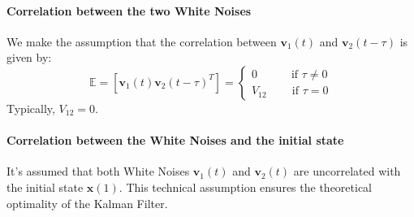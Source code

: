 \paragraph*{Correlation between the two White Noises}
We make the assumption that the correlation between $\mathbf{v}_1(t)$ and $\mathbf{v}_2(t-\tau)$ is given by:
\[\mathbb{E}=\left[\mathbf{v}_1(t)\mathbf{v}_2(t-\tau)^T\right]=\begin{cases}
    0 \qquad\quad\text{if }\tau\neq 0 \\
    V_{12} \qquad\:\text{if }\tau= 0
\end{cases}\]
Typically, $V_{12}=0$.

\paragraph*{Correlation between the White Noises and the initial state}
It's assumed that both White Noises $\mathbf{v}_1(t)$ and $\mathbf{v}_2(t)$ are uncorrelated with the initial state $\mathbf{x}(1)$. 
This technical assumption ensures the theoretical optimality of the Kalman Filter.

